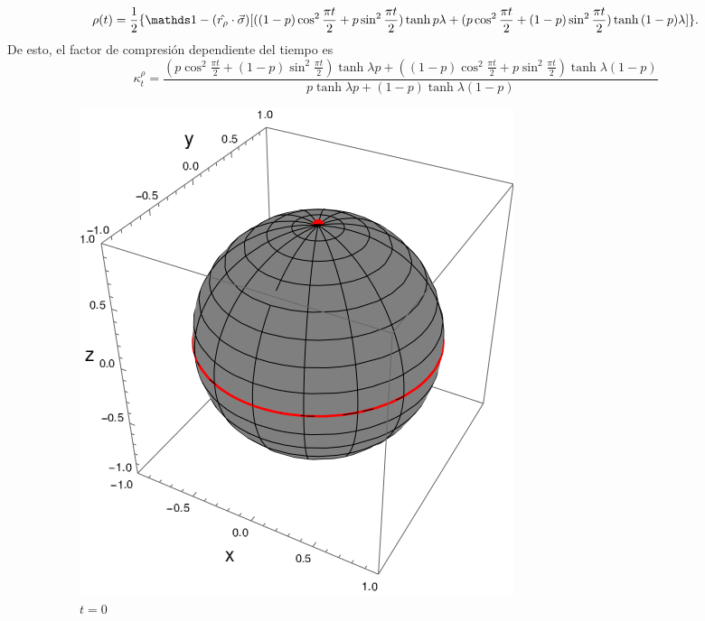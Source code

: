 \begin{equation}
  \rho(t)=\frac{1}{2}\{\Id-(\hat{r_{\rho}}\cdot\vec{\sigma})[((1-p)\cos^{2}{\frac{\pi t}{2}}+p\sin^{2}{\frac{\pi t}{2}})\tanh{p\lambda}+(p\cos^{2}{\frac{\pi t}{2}}+(1-p)\sin^{2}{\frac{\pi t}{2}})\tanh{(1-p)\lambda}]\}.
\end{equation}
De esto, el factor de compresión dependiente del tiempo es
\begin{equation}\label{eq:SWAPFactort}
  \kappa_{t}^{\rho}=\frac{(p\cos^{2}{\frac{\pi t}{2}}+(1-p)\sin^{2}{\frac{\pi t}{2}})\tanh{\lambda p}+((1-p)\cos^{2}{\frac{\pi t}{2}}+p\sin^{2}{\frac{\pi t}{2}})\tanh{\lambda (1-p)}}{
    p\tanh{\lambda p}+(1-p)\tanh{\lambda (1-p)}}
\end{equation}

\begin{figure}[h!]
  \centering
  \begin{subfigure}{0.32\textwidth}
    \centering
    \includegraphics[width=0.9\linewidth]{maxent/figures/sphere_swapcontraction_t=0.0_z=0.9_p=0.9.png}
    \caption{$t=0$}
  \end{subfigure}%
  \begin{subfigure}{0.32\textwidth}
    \centering

\end{subfigure}
\end{figure}
